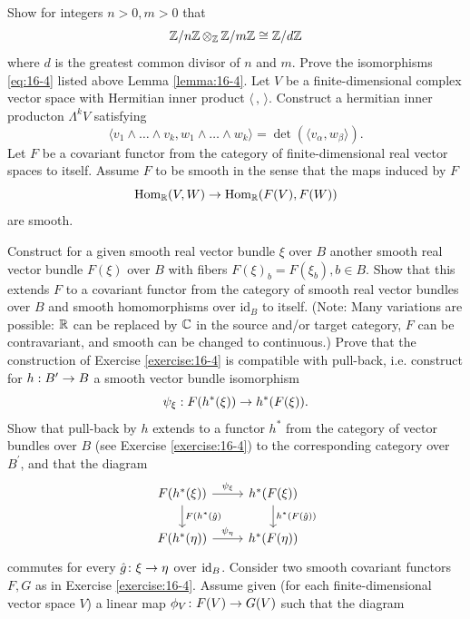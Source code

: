 \begin{enumerate}[label=\theexercise.\arabic*.,ref=\theexercise.\arabic*,leftmargin=2.7em]
  \newchap[16]
  \NewItem Show for integers $n > 0,m > 0$ that
    \[
      \mathbb{Z}/n\mathbb{Z}\,{ \otimes  }_{\mathbb{Z}}\,\mathbb{Z}/m\mathbb{Z} \cong  \mathbb{Z}/d\mathbb{Z}
    \]
    where $d$ is the greatest common divisor of $n$ and $m$.
  \NewItem Prove the isomorphisms \eqref{eq:16-4} listed above Lemma \ref{lemma:16-4}.
  \NewItem Let $V$ be a finite-dimensional complex vector space with Hermitian inner product $\langle\,,\, \rangle$. Construct a hermitian inner producton $\Lambda^kV$ satisfying
    \[
      \langle  {{v}_{1} \land  \ldots  \land  {v}_{k},{w}_{1} \land  \ldots  \land  {w}_{k}}\rangle   = \det ( \langle  {{v}_{\alpha },{w}_{\beta }}\rangle  ).
    \]
  \NewItem Let $F$ be a covariant functor from the category of finite-dimensional real vector spaces to itself. Assume $F$ to be smooth in the sense that the maps induced by $F$
    \[
      {\mathrm{Hom}}_{{\mathbb{R}}}( {V,W})  \rightarrow  {\ensuremath{\mathrm{Hom}}}_{{\mathbb{R}}}( {F( V),F( W) })
    \]
    are smooth.\par
    Construct for a given smooth real vector bundle $\xi$ over $B$ another smooth real vector bundle $F( \xi )$ over $B$ with fibers $F{( \xi ) }_{b} = F( {\xi }_{b}),b \in  B$.
    Show that this extends $F$ to a covariant functor from the category of smooth real vector bundles over $B$ and smooth homomorphisms over ${\mathrm{{id}}}_{B}$ to itself. (Note: Many variations are possible: $\mathbb{R}$ can be replaced by $\mathbb{C}$ in the source and/or target category, $F$ can be contravariant, and smooth can be changed to continuous.)
  \NewItem Prove that the construction of Exercise \ref{exercise:16-4} is compatible with pull-back, i.e. construct for $h : {B}^{\prime } \rightarrow  B$ a smooth vector bundle isomorphism
    \[
      {\psi }_{\xi } : F( {{h}^*( \xi ) })  \rightarrow  {h}^*( {F( \xi ) }).
    \]
    Show that pull-back by $h$ extends to a functor ${h}^*$ from the category of vector bundles over $B$ (see Exercise \ref{exercise:16-4}) to the corresponding category over ${B}^{\prime }$, and that the diagram
    \[\begin{tikzcd}
      F(h^*(\xi)) \rar{\psi_\xi}\dar{F(h^*(\hat{g})} & h^*(F(\xi))\dar{h^*(F( \hat{g}))} \\
      F( {{h}^*( \eta ) }) \rar{\psi_\eta } & h^*(F(\eta))
    \end{tikzcd}\]
    commutes for every $\hat{g}\colon \xi \rightarrow \eta$ over ${\mathrm{id}}_{B}$.
  \NewItem Consider two smooth covariant functors $F,G$ as in Exercise \ref{exercise:16-4}. Assume given (for each finite-dimensional vector space $V$) a linear map ${\phi }_{V}\colon F( V)  \rightarrow  G( V)$ such that the diagram
    \[\begin{tikzcd}

\end{tikzcd}\]
\end{enumerate}
